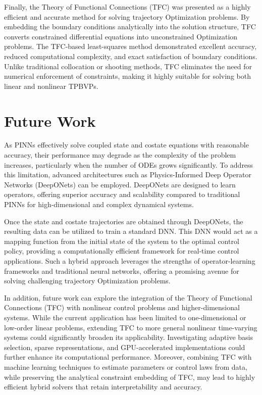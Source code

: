 Finally, the Theory of Functional Connections (TFC) was presented as a highly efficient and accurate method for solving trajectory Optimization problems. By embedding the boundary conditions analytically into the solution structure, TFC converts constrained differential equations into unconstrained Optimization problems. The TFC-based least-squares method demonstrated excellent accuracy, reduced computational complexity, and exact satisfaction of boundary conditions. Unlike traditional collocation or shooting methods, TFC eliminates the need for numerical enforcement of constraints, making it highly suitable for solving both linear and nonlinear TPBVPs.



\section*{Future Work}

As PINNs effectively solve coupled state and costate equations with reasonable accuracy, their performance may degrade as the complexity of the problem increases, particularly when the number of ODEs grows significantly. To address this limitation, advanced architectures such as Physics-Informed Deep Operator Networks (DeepONets) can be employed. DeepONets are designed to learn operators, offering superior accuracy and scalability compared to traditional PINNs for high-dimensional and complex dynamical systems.

Once the state and costate trajectories are obtained through DeepONets, the resulting data can be utilized to train a standard DNN. This DNN would act as a mapping function from the initial state of the system to the optimal control policy, providing a computationally efficient framework for real-time control applications. Such a hybrid approach leverages the strengths of operator-learning frameworks and traditional neural networks, offering a promising avenue for solving challenging trajectory Optimization problems.

In addition, future work can explore the integration of the Theory of Functional Connections (TFC) with nonlinear control problems and higher-dimensional systems. While the current application has been limited to one-dimensional or low-order linear problems, extending TFC to more general nonlinear time-varying systems could significantly broaden its applicability. Investigating adaptive basis selection, sparse representations, and GPU-accelerated implementations could further enhance its computational performance. Moreover, combining TFC with machine learning techniques to estimate parameters or control laws from data, while preserving the analytical constraint embedding of TFC, may lead to highly efficient hybrid solvers that retain interpretability and accuracy.

